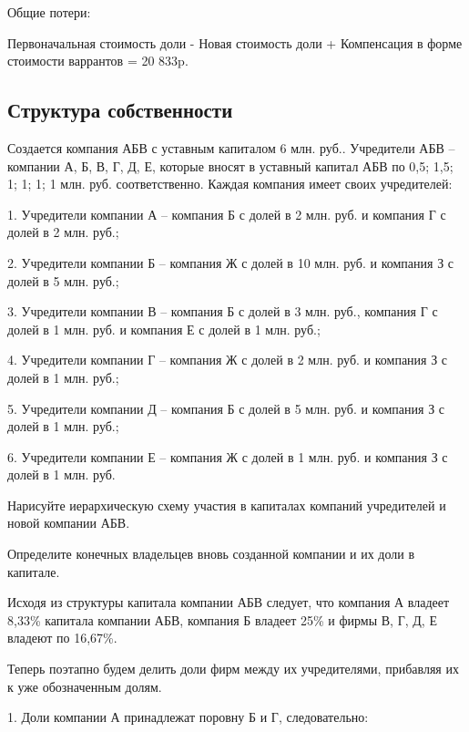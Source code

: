 \documentclass[12pt, table, a4paper,twoside]{exam}
\begin{document}
\begin{questions}
\begin{subparts}
\begin{solution}[12em]
		Общие потери:
		
		Первоначальная стоимость доли - Новая стоимость доли + Компенсация в форме стоимости варрантов =  20 833p.
		
	\end{solution}
	
\end{subparts}
\addpoints

\subsection{Структура собственности}
\question[20]
Создается компания АБВ с уставным капиталом 6 млн. руб.. Учредители АБВ – компании А, Б, В, Г, Д, Е, которые вносят в уставный капитал АБВ по 0,5; 1,5; 1; 1; 1; 1 млн. руб. соответственно. Каждая компания имеет своих учредителей:

1.	Учредители компании А – компания Б с долей в 2 млн. руб. и компания Г с долей в 2 млн. руб.;

2.	Учредители компании Б – компания Ж с долей в 10 млн. руб. и компания З с долей в 5 млн. руб.;

3.	Учредители компании В – компания Б с долей в 3 млн. руб., компания Г с долей в 1 млн. руб. и компания Е с долей в 1 млн. руб.;

4.	Учредители компании Г – компания Ж с долей в 2 млн. руб. и компания З с долей в 1 млн. руб.;

5.	Учредители компании Д – компания Б с долей в 5 млн. руб. и компания З с долей в 1 млн. руб.;

6.	Учредители компании Е – компания Ж с долей в 1 млн. руб. и компания З с долей в 1 млн. руб.

\noaddpoints
\begin{subparts}
	\subpart[10] Нарисуйте иерархическую схему участия в капиталах компаний учредителей и новой компании АБВ.

	\subpart[10] Определите конечных владельцев вновь созданной компании и их доли в капитале.
	
	\begin{solution}[12em]
		Исходя из структуры капитала компании АБВ следует, что компания А владеет 8,33\% капитала компании АБВ, компания Б владеет 25\% и фирмы В, Г, Д, Е владеют по 16,67\%.
		
		Теперь поэтапно будем делить доли фирм между их учредителями, прибавляя их к уже обозначенным долям.
		
		1.	Доли компании А принадлежат поровну Б и Г, следовательно:
		

\end{solution}
\end{subparts}
\end{questions}
\end{document}
